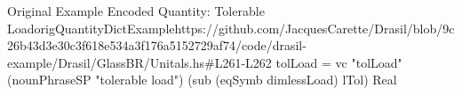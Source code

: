 \begin{haskell}{Original Example Encoded Quantity: Tolerable Load}{origQuantityDictExample}{https://github.com/JacquesCarette/Drasil/blob/9c26b43d3e30c3f618e534a3f176a5152729af74/code/drasil-example/Drasil/GlassBR/Unitals.hs\#L261-L262}
tolLoad = vc "tolLoad" (nounPhraseSP "tolerable load")
    (sub (eqSymb dimlessLoad) lTol) Real
\end{haskell}
